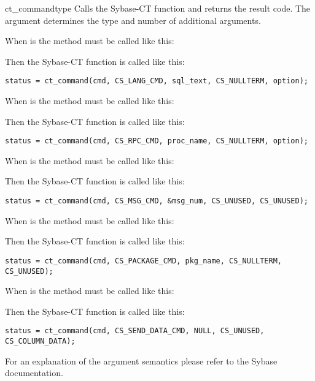 \begin{methoddesc}[CS_COMMAND]{ct_command}{type \optional{, \ldots}}
Calls the Sybase-CT  function and returns the
result code.  The  argument determines the type and number
of additional arguments.

When  is  the method must be called like
this:


Then the Sybase-CT  function is called like
this:

\begin{verbatim}
status = ct_command(cmd, CS_LANG_CMD, sql_text, CS_NULLTERM, option);
\end{verbatim}

When  is  the method must be called like
this:


Then the Sybase-CT  function is called like
this:

\begin{verbatim}
status = ct_command(cmd, CS_RPC_CMD, proc_name, CS_NULLTERM, option);
\end{verbatim}

When  is  the method must be called like
this:


Then the Sybase-CT  function is called like
this:

\begin{verbatim}
status = ct_command(cmd, CS_MSG_CMD, &msg_num, CS_UNUSED, CS_UNUSED);
\end{verbatim}

When  is  the method must be called like
this:


Then the Sybase-CT  function is called like
this:

\begin{verbatim}
status = ct_command(cmd, CS_PACKAGE_CMD, pkg_name, CS_NULLTERM, CS_UNUSED);
\end{verbatim}

When  is  the method must be called like
this:


Then the Sybase-CT  function is called like
this:

\begin{verbatim}
status = ct_command(cmd, CS_SEND_DATA_CMD, NULL, CS_UNUSED, CS_COLUMN_DATA);
\end{verbatim}

For an explanation of the argument semantics please refer to the
Sybase documentation.
\end{methoddesc}

